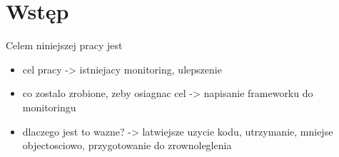 \section{Wstęp}
Celem niniejszej pracy jest 

\begin{itemize}
\item cel pracy -> istniejacy monitoring, ulepszenie
\item co zostalo zrobione, zeby osiagnac cel -> napisanie frameworku do monitoringu
\item dlaczego jest to wazne? -> latwiejsze uzycie kodu, utrzymanie, mniejse objectosciowo, przygotowanie do zrownoleglenia
\end{itemize}
